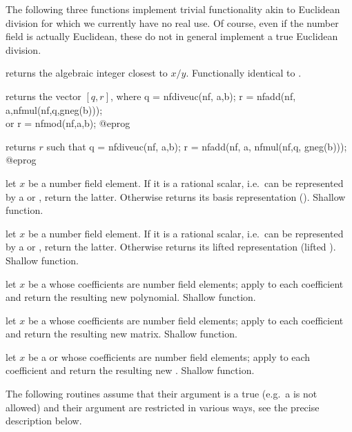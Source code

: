 The following three functions implement trivial functionality akin to
Euclidean division for which we currently have no real use. Of course, even if
the number field is actually Euclidean, these do not in general implement a
true Euclidean division.

 returns the algebraic integer
closest to $x / y$. Functionally identical to .

 returns the vector $[q,r]$, where
\bprog
  q = nfdiveuc(nf, a,b);
  r = nfadd(nf, a,nfmul(nf,q,gneg(b)));    \\ or r = nfmod(nf,a,b);
@eprog

 returns $r$ such that
\bprog
  q = nfdiveuc(nf, a,b);
  r = nfadd(nf, a, nfmul(nf,q, gneg(b)));
@eprog

 let $x$ be a number field
element. If it is a rational scalar, i.e.~can be represented by a 
or , return the latter. Otherwise returns its basis representation
(). Shallow function.

 let $x$ be a number field
element. If it is a rational scalar, i.e.~can be represented by a 
or , return the latter. Otherwise returns its lifted 
representation (lifted ). Shallow function.

 let $x$ be a  whose coefficients
are number field elements; apply  to each
coefficient and return the resulting new polynomial. Shallow function.

 let $x$ be a  whose coefficients
are number field elements; apply  to each
coefficient and return the resulting new matrix. Shallow function.

 let $x$ be a  or
 whose coefficients
are number field elements; apply  to each
coefficient and return the resulting new . Shallow function.

 The following routines assume that their 
argument is a true  (e.g.~a  is not allowed) and their
argument are restricted in various ways, see the precise description below.

